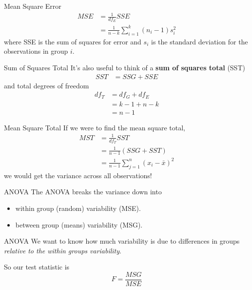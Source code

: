 \begin{frame}{Mean Square Error}
    \begin{align*}
        MSE &= \frac{1}{df_E}SSE \\
        &= \frac{1}{n-k}\sum_{i=1}^k (n_i - 1)s_i^2
    \end{align*}
    where SSE is the sum of squares for error and $s_i$ is the standard deviation for the observations in group $i$.
\end{frame}

\begin{frame}{Sum of Squares Total}
    It's also useful to think of a \textbf{sum of squares total} (SST)
    \begin{align*}
        SST &= SSG + SSE
    \end{align*}
    and total degrees of freedom
    \begin{align*}
        df_T &= df_G + df_E \\
        &= k-1 + n-k \\ 
        &= n-1
    \end{align*}
\end{frame}

\begin{frame}{Mean Square Total}
    If we were to find the mean square total,
    \begin{align*}
        MST &= \frac{1}{df_T}SST \\
        &= \frac{1}{n-1}(SSG + SST) \\
        &= \frac{1}{n-1}\sum_{j=1}^n(x_i - \bar{x})^2
    \end{align*}
    we would get the variance across all observations!
\end{frame}

\begin{frame}{ANOVA}
    The ANOVA breaks the variance down into 
    \begin{itemize}
        \item within group (random) variability (MSE).
        \item between group (means) variability (MSG).
    \end{itemize}
\end{frame}

\begin{frame}{ANOVA}
    We want to know how much variability is due to differences in groups \textit{relative to the within groups variability}. 
    
    \vspace{12pt}So our test statistic is
    \[
        F = \frac{MSG}{MSE}
    \]
\end{frame}

